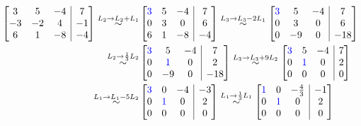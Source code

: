 \begin{align*}
\left[
\begin{array}{@{}ccc|c@{}}
3 & 5 & -4 & 7 \\
-3 & -2 & 4 & -1\\
6 & 1 & -8 & -4
\end{array}
\right]
\overset{L_2 \to L_2 + L_1}{\sim}
&\left[
\begin{array}{@{}ccc|c@{}}
\color{blue}3 & 5 & -4 & 7 \\
0 & 3 & 0 & 6\\
6 & 1 & -8 & -4\\
\end{array}
\right]
\overset{L_3 \to L_3 - 2L_1}{\sim}
\left[
\begin{array}{@{}ccc|c@{}}
\color{blue}3 & 5 & -4 & 7 \\
0 & 3 & 0 & 6\\
0 & -9 & 0 & -18\\
\end{array}
\right]\\
\overset{L_2 \to \frac{1}{3}L_2}{\sim}
&\left[
\begin{array}{@{}ccc|c@{}}
\color{blue}3 & 5 & -4 & 7 \\
0 & \color{blue}1 & 0 & 2\\
0 & -9 & 0 & -18\\
\end{array}
\right]
\overset{L_3 \to L_3 + 9L_2}{\sim}
\left[
\begin{array}{@{}ccc|c@{}}
\color{blue}3 & 5 & -4 & 7 \\
0 & \color{blue}1 & 0 & 2\\
0 & 0 & 0 & 0\\
\end{array}
\right]\\
\overset{L_1 \to L_1 - 5L_2}{\sim}
&\left[
\begin{array}{@{}ccc|c@{}}
\color{blue}3 & 0 & -4 & -3 \\
0 & \color{blue}1 & 0 & 2\\
0 & 0 & 0 & 0\\
\end{array}
\right]
\overset{L_1 \to \frac{1}{3}L_1}{\sim}
\left[
\begin{array}{@{}ccc|c@{}}
\color{blue}1 & 0 & -\frac{4}{3} & -1 \\
0 & \color{blue}1 & 0 & 2\\
0 & 0 & 0 & 0\\
\end{array}
\right]
\end{align*}
